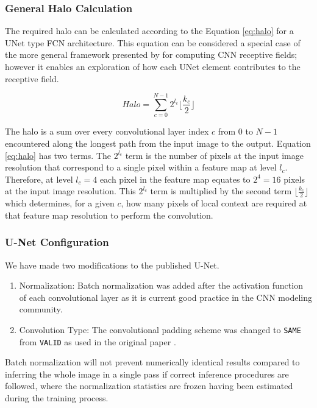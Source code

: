 \documentclass[10pt, indentfirst]{article}
\begin{document}
\subsubsection{General Halo Calculation}

The required halo can be calculated according to the Equation \ref{eq:halo} for a UNet type FCN architecture.
This equation can be considered a special case of the more general framework presented by \cite{araujo2019computing} for computing CNN receptive fields; however it enables an exploration of how each UNet element contributes to the receptive field.

\begin{equation}
Halo = \sum_{c=0}^{N-1} 2^{l_c} \lfloor \frac{k_c}{2} \rfloor
\label{eq:halo}
\end{equation}

The halo is a sum over every convolutional layer index $c$ from $0$ to $N-1$ encountered along the longest path from the input image to the output.
Equation \ref{eq:halo} has two terms.
The $2^{l_c}$ term is the number of pixels at the input image resolution that correspond to a single pixel within a feature map at level $l_c$.
Therefore, at level $l_c=4$ each pixel in the feature map equates to $2^4 = 16$ pixels at the input image resolution.
This $2^{l_c}$ term is multiplied by the second term $\lfloor \frac{k_c}{2} \rfloor$ which determines, for a given $c$, how many pixels of local context are required at that feature map resolution to perform the convolution.

\subsubsection{U-Net Configuration}

We have made two modifications to the published U-Net.

\begin{enumerate}
	\item Normalization: Batch normalization \citep{ioffe2015batch} was added after the activation function of each convolutional layer as it is current good practice in the CNN modeling community.
	\item Convolution Type: The convolutional padding scheme was changed to \texttt{SAME} from \texttt{VALID} as used in the original paper \citep{Ronneberger2015a}.
\end{enumerate} 

Batch normalization will not prevent numerically identical results compared to inferring the whole image in a single pass if correct inference procedures are followed, where the normalization statistics are frozen having been estimated during the training process.
\end{document}
